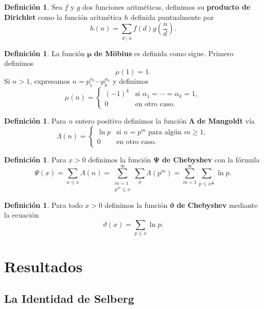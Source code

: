 \documentclass[10pt]{article}
\theoremstyle{definition}
\newtheorem{defn}[theorem]{Definici\'on}
\theoremstyle{remark}
\begin{document}
\begin{defn}\label{def03}
Sea $f$ y $g$ dos funciones aritm\'eticas, 
definimos su {\bf producto de Dirichlet} como la funci\'on aritm\'etica $h$ definida puntualmente por 
\[
h(n) = \sum_{d \mid n} f(d) g\left(\frac{n}{d}\right).
\]
\end{defn}

\begin{defn}
La funci\'on $\boldsymbol{\mu}$ \textbf{de M\"{o}bius} es definida como sigue. 
Primero definimos 
\[
\mu(1) = 1.
\]
Si $n > 1$, expresamos $n = p_1^{\alpha_1} \cdots p_k^{\alpha_k}$ y 
definimos 
\[
\mu(n) = 
\begin{cases}
(-1)^k &\text{si } \alpha_1 = \cdots = \alpha_k = 1, \\
0 &\text{en otro caso}. 
\end{cases}
\]
\end{defn}

\begin{defn}
Para $n$ entero positivo definimos la funci\'on $\boldsymbol{\Lambda}$ \textbf{de Mangoldt} v\'ia 
\[
\Lambda(n) =
\begin{cases}
\ln p &\text{si } n = p^m \text{ para alg\'un } m \geq 1,\\
0 &\text{en otro caso.}
\end{cases}
\]
\end{defn}

\begin{defn}
Para $x > 0$ definimos la funci\'on $\boldsymbol{\Psi}$ \textbf{de Chebyshev} con la f\'ormula
\[
\Psi(x) = \sum_{n \leq x} \Lambda(n) 
= \sum_{\substack{m = 1\\p^m \leq x}}^\infty \sum_p \Lambda(p^m)
= \sum_{m = 1}^\infty \sum_{p \leq x^{\frac{1}{m}}} \ln p.
\]
\end{defn}

\begin{defn}
Para todo $x > 0$ definimos la funci\'on $\boldsymbol{\vartheta}$ \textbf{de Chebyshev} mediante la ecuaci\'on
\[
\vartheta(x) = \sum_{p \leq x} \ln p.
\]
\end{defn}

\section{Resultados}

\subsection{La Identidad de Selberg}
\end{document}
